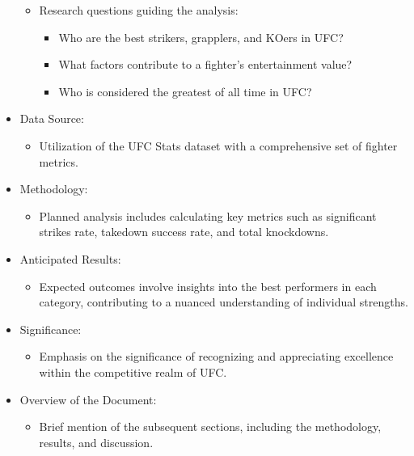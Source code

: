 \documentclass[
  man,floatsintext]{apa6}
\providecommand{\tightlist}{%
  \setlength{\itemsep}{0pt}\setlength{\parskip}{0pt}}
\begin{document}
\begin{itemize}
  \begin{itemize}
  \tightlist
  \item
    Research questions guiding the analysis:

    \begin{itemize}
    \tightlist
    \item
      Who are the best strikers, grapplers, and KOers in UFC?
    \item
      What factors contribute to a fighter's entertainment value?
    \item
      Who is considered the greatest of all time in UFC?
    \end{itemize}
  \end{itemize}
\item
  Data Source:

  \begin{itemize}
  \tightlist
  \item
    Utilization of the UFC Stats dataset with a comprehensive set of fighter metrics.
  \end{itemize}
\item
  Methodology:

  \begin{itemize}
  \tightlist
  \item
    Planned analysis includes calculating key metrics such as significant strikes rate, takedown success rate, and total knockdowns.
  \end{itemize}
\item
  Anticipated Results:

  \begin{itemize}
  \tightlist
  \item
    Expected outcomes involve insights into the best performers in each category, contributing to a nuanced understanding of individual strengths.
  \end{itemize}
\item
  Significance:

  \begin{itemize}
  \tightlist
  \item
    Emphasis on the significance of recognizing and appreciating excellence within the competitive realm of UFC.
  \end{itemize}
\item
  Overview of the Document:

  \begin{itemize}
  \tightlist
  \item
    Brief mention of the subsequent sections, including the methodology, results, and discussion.
  \end{itemize}
\end{itemize}
\end{document}
